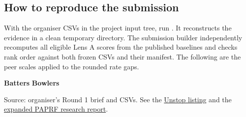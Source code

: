 \documentclass[11pt,a4paper]{article}
\begin{document}
\subsection*{How to reproduce the submission}
With the organiser CSVs in the project input tree, run . It reconstructs the evidence in a clean temporary directory. The submission builder independently recomputes all \ScoreCount{} eligible Lens A scores from the published baselines and checks rank order against both frozen CSVs and their manifest. The following are the peer scales applied to the rounded rate gaps.

\textbf{Batters}\BatterPeerTable\endminipage\hfill
{}\textbf{Bowlers}\BowlerPeerTable\endminipage

Source: organiser's Round 1 brief and CSVs. See the \href{https://unstop.com/o/owqQZ3f}{Unstop listing} and the \href{https://dashboard-seven-delta-35.vercel.app/reports/paprf_research.pdf}{expanded PAPRF research report}.
\end{document}
